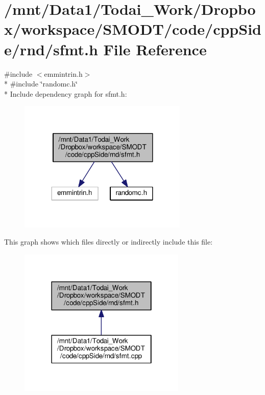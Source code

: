\section{/mnt/\-Data1/\-Todai\-\_\-\-Work/\-Dropbox/workspace/\-S\-M\-O\-D\-T/code/cpp\-Side/rnd/sfmt.h File Reference}
\label{rnd_2sfmt_8h}
{\ttfamily \#include $<$emmintrin.\-h$>$}\\*
{\ttfamily \#include \char`\"{}randomc.\-h\char`\"{}}\\*
Include dependency graph for sfmt.\-h\-:\nopagebreak
\begin{figure}[H]
\begin{center}
\leavevmode
\includegraphics[width=228pt]{rnd_2sfmt_8h__incl}
\end{center}
\end{figure}
This graph shows which files directly or indirectly include this file\-:\nopagebreak
\begin{figure}[H]
\begin{center}
\leavevmode
\includegraphics[width=226pt]{rnd_2sfmt_8h__dep__incl}
\end{center}
\end{figure}
